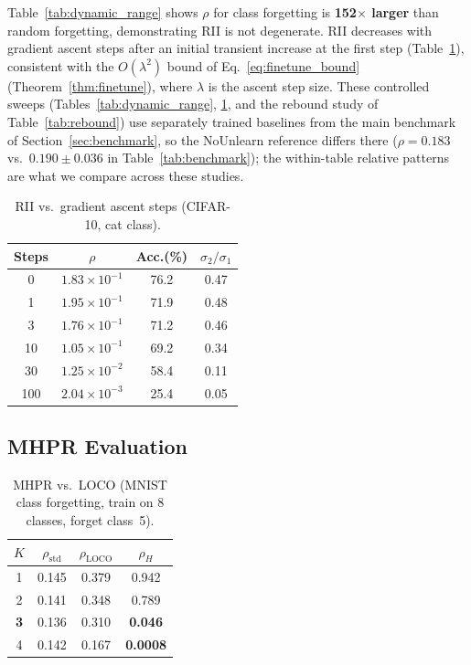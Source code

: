 \documentclass[smallextended]{svjour3}       %
\begin{document}
Table~\ref{tab:dynamic_range} shows $\rho$ for class forgetting is \textbf{152$\times$ larger} than random forgetting, demonstrating RII is not degenerate. RII decreases with gradient ascent steps after an initial transient increase at the first step (Table~\ref{tab:gradient_sweep}), consistent with the $O(\lambda^2)$ bound of Eq.~\eqref{eq:finetune_bound} (Theorem~\ref{thm:finetune}), where $\lambda$ is the ascent step size. These controlled sweeps (Tables~\ref{tab:dynamic_range}, \ref{tab:gradient_sweep}, and the rebound study of Table~\ref{tab:rebound}) use separately trained baselines from the main benchmark of Section~\ref{sec:benchmark}, so the NoUnlearn reference differs there ($\rho{=}0.183$ vs.\ $0.190{\pm}0.036$ in Table~\ref{tab:benchmark}); the within-table relative patterns are what we compare across these studies.

\begin{table}[t]
\centering
\small
\caption{RII vs.\ gradient ascent steps (CIFAR-10, cat class).}\label{tab:gradient_sweep}
\setlength{\tabcolsep}{2pt}
\begin{tabular}{c c c c}
\toprule
Steps & $\rho$ & Acc.(\%) & $\sigma_2/\sigma_1$ \\
\midrule
0 & $1.83\times10^{-1}$ & 76.2 & 0.47 \\
1 & $1.95\times10^{-1}$ & 71.9 & 0.48 \\
3 & $1.76\times10^{-1}$ & 71.2 & 0.46 \\
10 & $1.05\times10^{-1}$ & 69.2 & 0.34 \\
30 & $1.25\times10^{-2}$ & 58.4 & 0.11 \\
100 & $2.04\times10^{-3}$ & 25.4 & 0.05 \\
\bottomrule
\end{tabular}
\end{table}

\subsection{MHPR Evaluation}

\begin{table}[t]
\centering
\small
\caption{MHPR vs.\ LOCO (MNIST class forgetting, train on 8 classes, forget class~5).}\label{tab:mhpr}
\setlength{\tabcolsep}{2pt}
\begin{tabular}{c c c c}
\toprule
$K$ & $\rho_{\mathrm{std}}$ & $\rho_{\mathrm{LOCO}}$ & $\rho_H$ \\
\midrule
1 & 0.145 & 0.379 & 0.942 \\
2 & 0.141 & 0.348 & 0.789 \\
\textbf{3} & 0.136 & 0.310 & \textbf{0.046} \\
4 & 0.142 & 0.167 & \textbf{0.0008} \\
\bottomrule
\end{tabular}
\end{table}
\end{document}
